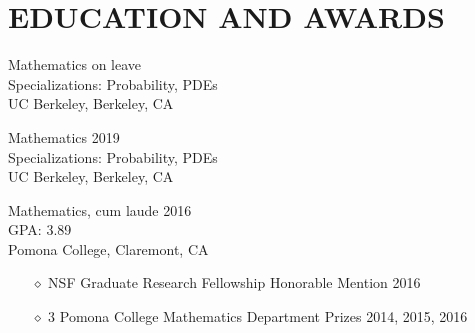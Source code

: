 \documentclass{simplecv}
\begin{document}
\vspace{-0.4cm}

\section{EDUCATION AND AWARDS} 
\begin{multicols}{3}

 Mathematics \hfill on leave \\
Specializations: Probability, PDEs \hfill\\
UC Berkeley, Berkeley, CA

\columnbreak

 Mathematics \hfill 2019  \\
Specializations: Probability, PDEs \\
UC Berkeley, Berkeley, CA\\
\columnbreak

 Mathematics, cum laude \hfill 2016   \\
GPA: 3.89 \\%
                Pomona College, Claremont, CA \\

\end{multicols}
\vspace{-0.7cm} 

\begin{itemize}
  \item[$\diamond$] NSF Graduate Research Fellowship Honorable Mention \hfill 2016
  \item[$\diamond$] 3 Pomona College Mathematics Department Prizes \hfill 2014, 2015, 2016
\end{itemize}

\end{document}
